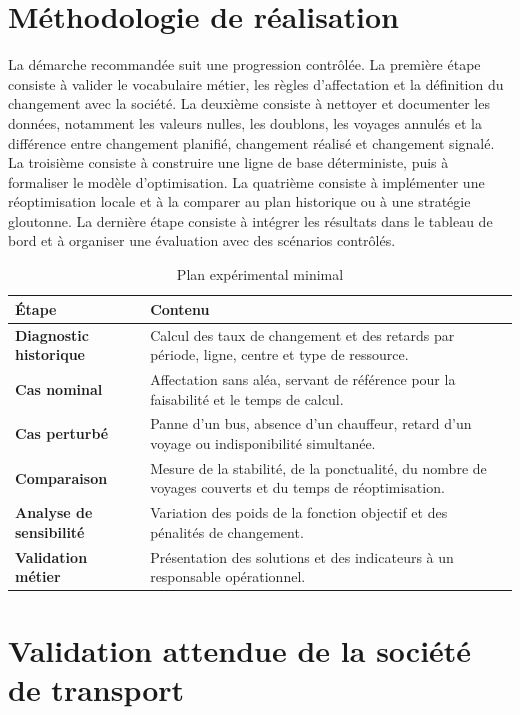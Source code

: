 \documentclass[12pt,a4paper]{article}
\begin{document}
\section{Méthodologie de réalisation}

La démarche recommandée suit une progression contrôlée. La première étape consiste à valider le vocabulaire métier, les règles d’affectation et la définition du changement avec la société. La deuxième consiste à nettoyer et documenter les données, notamment les valeurs nulles, les doublons, les voyages annulés et la différence entre changement planifié, changement réalisé et changement signalé. La troisième consiste à construire une ligne de base déterministe, puis à formaliser le modèle d’optimisation. La quatrième consiste à implémenter une réoptimisation locale et à la comparer au plan historique ou à une stratégie gloutonne. La dernière étape consiste à intégrer les résultats dans le tableau de bord et à organiser une évaluation avec des scénarios contrôlés.

\begin{table}[ht]
\centering
\caption{Plan expérimental minimal}
\begin{tabularx}{\textwidth}{>{\bfseries}p{3.5cm} X}
\toprule
Étape & Contenu \\
\midrule
Diagnostic historique & Calcul des taux de changement et des retards par période, ligne, centre et type de ressource. \\
Cas nominal & Affectation sans aléa, servant de référence pour la faisabilité et le temps de calcul. \\
Cas perturbé & Panne d’un bus, absence d’un chauffeur, retard d’un voyage ou indisponibilité simultanée. \\
Comparaison & Mesure de la stabilité, de la ponctualité, du nombre de voyages couverts et du temps de réoptimisation. \\
Analyse de sensibilité & Variation des poids de la fonction objectif et des pénalités de changement. \\
Validation métier & Présentation des solutions et des indicateurs à un responsable opérationnel. \\
\bottomrule
\end{tabularx}
\end{table}

\section{Validation attendue de la société de transport}
\end{document}
